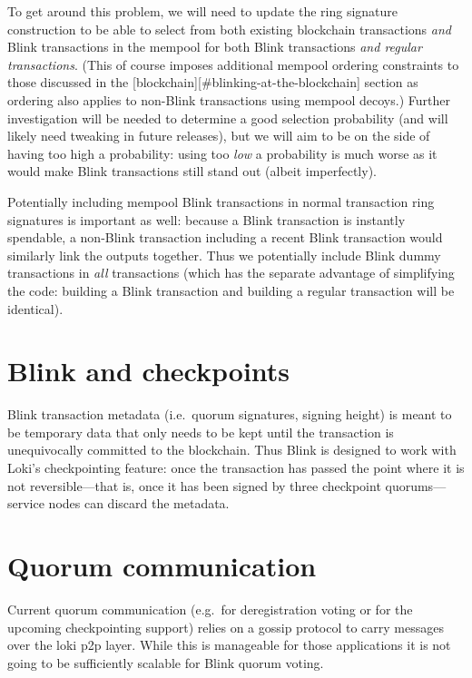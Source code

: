 To get around this problem, we will need to update the ring signature
construction to be able to select from both existing blockchain
transactions \emph{and} Blink transactions in the mempool for both Blink
transactions \emph{and regular transactions}. (This of course imposes
additional mempool ordering constraints to those discussed in the
{[}blockchain{]}{[}\#blinking-at-the-blockchain{]} section as ordering
also applies to non-Blink transactions using mempool decoys.) Further
investigation will be needed to determine a good selection probability
(and will likely need tweaking in future releases), but we will aim to
be on the side of having too high a probability: using too \emph{low} a
probability is much worse as it would make Blink transactions still
stand out (albeit imperfectly).

Potentially including mempool Blink transactions in normal transaction
ring signatures is important as well: because a Blink transaction is
instantly spendable, a non-Blink transaction including a recent Blink
transaction would similarly link the outputs together. Thus we
potentially include Blink dummy transactions in \emph{all} transactions
(which has the separate advantage of simplifying the code: building a
Blink transaction and building a regular transaction will be identical).

\hypertarget{blink-and-checkpoints}{%
\section{Blink and checkpoints}\label{blink-and-checkpoints}}

Blink transaction metadata (i.e.~quorum signatures, signing height) is
meant to be temporary data that only needs to be kept until the
transaction is unequivocally committed to the blockchain. Thus Blink is
designed to work with Loki's checkpointing feature: once the transaction
has passed the point where it is not reversible---that is, once it has
been signed by three checkpoint quorums---service nodes can discard the
metadata.

\hypertarget{quorum-communication}{%
\section{Quorum communication}\label{quorum-communication}}

Current quorum communication (e.g.~for deregistration voting or for the
upcoming checkpointing support) relies on a gossip protocol to carry
messages over the loki p2p layer. While this is manageable for those
applications it is not going to be sufficiently scalable for Blink
quorum voting.

